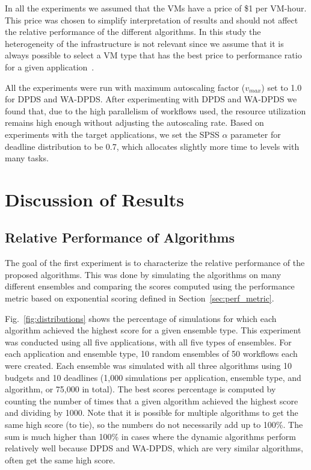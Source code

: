 \documentclass[conference]{IEEEtran}
\begin{document}
In all the experiments we assumed that the VMs have a price of \$1 per VM-hour.
This price was chosen to simplify interpretation of results and should not
affect the relative performance of the different algorithms. In this study the
heterogeneity of the infrastructure is not relevant since we assume that it is
always possible to select a VM type that has the best price to performance ratio
for a given application~\cite{Juve2009}.

All the experiments were run with maximum autoscaling factor ($v_{max}$) set to
1.0 for DPDS and WA-DPDS. After experimenting with DPDS and WA-DPDS we found
that, due to the high parallelism of workflows used, the resource utilization
remains high enough without adjusting the autoscaling rate. Based on experiments
with the target applications, we set the SPSS $\alpha$ parameter for deadline
distribution to be 0.7, which allocates slightly more time to levels with many
tasks.







\section{Discussion of Results}
\label{sec:results}



\subsection{Relative Performance of Algorithms}

The goal of the first experiment is to characterize the relative performance
of the proposed algorithms. This was done by simulating the algorithms on many
different ensembles and comparing the scores computed using the
performance metric based on exponential scoring defined in
Section~\ref{sec:perf_metric}.

Fig.~\ref{fig:distributions} shows the percentage of simulations for which
each algorithm achieved the highest score for a given ensemble type. This
experiment was conducted using all five applications, with all five types of
ensembles. For each application and ensemble type, 10 random ensembles of 50
workflows each were created. Each ensemble was simulated with all three
algorithms using 10 budgets and 10 deadlines (1,000 simulations per
application, ensemble type, and algorithm, or 75,000 in total). The best scores percentage is
computed by counting the number of times that a given algorithm achieved the
highest score and dividing by 1000. Note that it is possible for multiple
algorithms to get the same high score (to tie), so the numbers do not
necessarily add up to 100\%. The sum is much higher than 100\% in cases where
the dynamic algorithms perform relatively well because DPDS and WA-DPDS, which
are very similar algorithms, often get the same high score.
\end{document}
